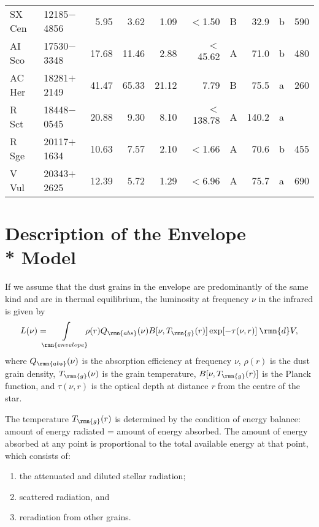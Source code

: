 \documentclass[useAMS,usedcolumn,usegraphicx,usenatbib]{mn2e}
\begin{document}
\begin{table*}
\begin{minipage}{140mm}
\begin{tabular}{@{}llrrrrlrlr@{}}
 SX Cen & 12185$-$4856 & 5.95 & 3.62 & 1.09 & $<$1.50 & B & 32.9 & b & 590 \\
 AI Sco & 17530$-$3348 & 17.68 & 11.46 & 2.88 & $<$45.62 & A & 71.0 & b & 480 \\
 AC Her & 18281$+$2149 & 41.47 & 65.33 & 21.12 & 7.79 & B & 75.5 & a & 260 \\
 R Sct  & 18448$-$0545 & 20.88 & 9.30 & 8.10 & $<$138.78 & A & 140.2 & a \\
 R Sge  & 20117$+$1634 & 10.63 & 7.57 & 2.10 & $<$1.66 & A & 70.6 & b & 455 \\
 V Vul  & 20343$+$2625 & 12.39 & 5.72 & 1.29 & $<$6.96 & A & 75.7 & a & 690\\
\hline
\end{tabular}
\end{minipage}
\end{table*}

\section[]{Description of the Envelope\\* Model}

If we assume that the dust grains in the envelope are  predominantly of
the same kind and are in thermal  equilibrium, the luminosity at
frequency $\nu$ in the infrared is given by
\begin{equation}
   L(\nu)=\mskip-12mu\int\limits_{\rmn{envelope}}\mskip-12mu
   \rho(r)Q_{\rmn{abs}}(\nu)B[\nu,T_{\rmn{g}}(r)]\exp [-\tau(\nu,r)]\>
   \rmn{d}V,
\end{equation}
 where
 $Q_{\rmn{abs}}(\nu)$ is the absorption efficiency at frequency $\nu$,
 $\rho(r)$            is the dust grain density,
 $T_{\rmn{g}}(\nu)$    is the grain temperature,
 $B[\nu,T_{\rmn{g}}(r)]$  is the Planck function, and
 $\tau(\nu,r)$        is the optical depth at distance {\it r\/} from the
                      centre of the star.

The temperature $T_{\rmn{g}}(r)$ is determined by the condition of energy
balance: amount of energy radiated = amount of energy absorbed. The
amount of energy absorbed at any point is proportional to the total
available energy at that point, which consists of:
\begin{enumerate}
  \item the attenuated and diluted stellar radiation;
  \item scattered radiation, and
  \item reradiation from other grains.
\end{enumerate}
\end{document}
